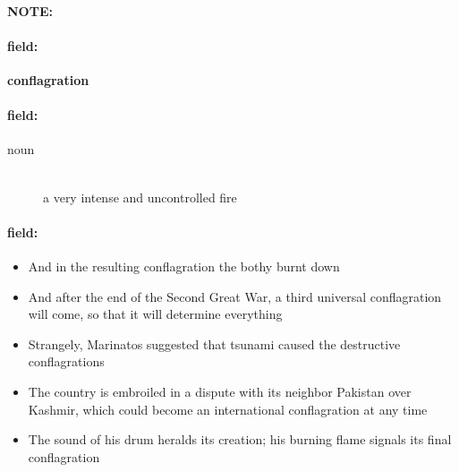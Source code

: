 \documentclass[12pt]{article}
\newenvironment{note}{\paragraph{NOTE:}}{}
\newenvironment{field}{\paragraph{field:}}{}
\begin{document}
\begin{note}
\begin{field}
\textbf{\large conflagration}
\end{field}


\begin{field}
\begin{description}
\item[noun] \hfill \\ 
a very intense and uncontrolled fire

\end{description}
\end{field}

\begin{field}
\begin{itemize}
\item And in the resulting conflagration the bothy burnt down
\item And after the end of the Second Great War, a third universal conflagration will come, so that it will determine everything
\item Strangely, Marinatos suggested that tsunami caused the destructive conflagrations
\item The country is embroiled in a dispute with its neighbor Pakistan over Kashmir, which could become an international conflagration at any time
\item The sound of his drum heralds its creation; his burning flame signals its final conflagration
\end{itemize}
\end{field}
\end{note}
\end{document}

